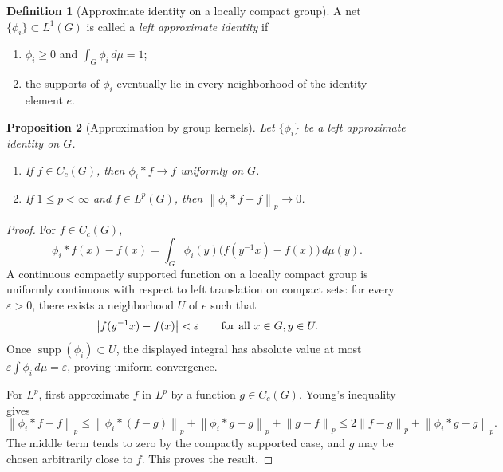 \documentclass[11pt,openany]{book}
\numberwithin{equation}{chapter}
\theoremstyle{definition}
\newtheorem{definition}{Definition}[chapter]
\theoremstyle{plain}
\newtheorem{proposition}[definition]{Proposition}
\theoremstyle{remark}
\newcommand{\eps}{\varepsilon}
\newcommand{\1}{\mathbf{1}}
\newcommand{\dd}{\,d}
\newcommand{\abs}[1]{\left\lvert #1\right\rvert}
\newcommand{\norm}[1]{\left\lVert #1\right\rVert}
\newcommand{\supp}{\operatorname{supp}}
\begin{document}
\begin{definition}[Approximate identity on a locally compact group]
A net \(\{\phi_i\}\subset L^1(G)\) is called a \emph{left approximate identity} if
\begin{enumerate}[label=\textup{(\roman*)}]
  \item \(\phi_i\ge0\) and \(\int_G\phi_i\dd\mu=1\);
  \item the supports of \(\phi_i\) eventually lie in every neighborhood of the identity element \(e\).
\end{enumerate}
\end{definition}

\begin{proposition}[Approximation by group kernels]
Let \(\{\phi_i\}\) be a left approximate identity on \(G\).
\begin{enumerate}[label=\textup{(\roman*)}]
  \item If \(f\in C_c(G)\), then \(\phi_i*f\to f\) uniformly on \(G\).
  \item If \(1\le p<\infty\) and \(f\in L^p(G)\), then \(\norm{\phi_i*f-f}_p\to0\).
\end{enumerate}
\end{proposition}

\begin{proof}
For \(f\in C_c(G)\),
\[
  \phi_i*f(x)-f(x)=\int_G\phi_i(y)\bigl(f(y^{-1}x)-f(x)\bigr)\dd\mu(y).
\]
A continuous compactly supported function on a locally compact group is uniformly continuous with respect to left translation on compact sets: for every \(\eps>0\), there exists a neighborhood \(U\) of \(e\) such that
\[
  \abs{f(y^{-1}x)-f(x)}<\eps
  \qquad\text{for all }x\in G,\\ y\in U.
\]
Once \(\supp(\phi_i)\subset U\), the displayed integral has absolute value at most \(\eps\int\phi_i\dd\mu=\eps\), proving uniform convergence.

For \(L^p\), first approximate \(f\) in \(L^p\) by a function \(g\in C_c(G)\).  Young's inequality gives
\[
  \norm{\phi_i*f-f}_p
  \le \norm{\phi_i*(f-g)}_p+\norm{\phi_i*g-g}_p+\norm{g-f}_p
  \le 2\norm{f-g}_p+\norm{\phi_i*g-g}_p.
\]
The middle term tends to zero by the compactly supported case, and \(g\) may be chosen arbitrarily close to \(f\).  This proves the result.
\end{proof}
\end{document}
